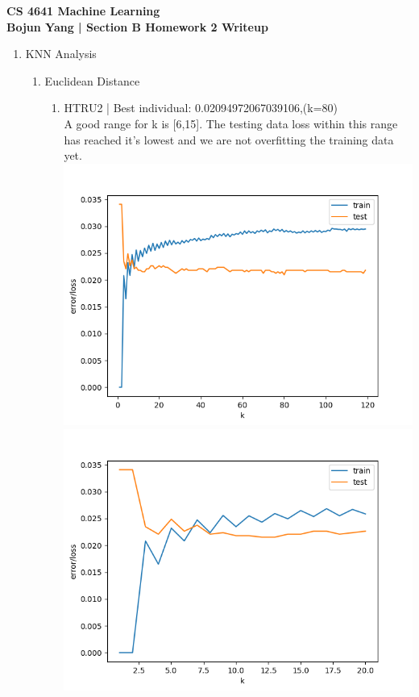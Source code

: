 \documentclass[12pt]{article}
\begin{document}
\begin{center}
    \textbf{CS 4641 Machine Learning \\ Bojun Yang | Section B Homework 2 Writeup}
\end{center}

\begin{enumerate}[noitemsep,topsep=1pt]
\item KNN Analysis
\begin{enumerate}[noitemsep,topsep=1pt]
    \item Euclidean Distance
    \begin{enumerate}[noitemsep,topsep=1pt]
        \item HTRU2 | Best individual: 0.02094972067039106,(k=80)
        \\ A good range for k is [6,15]. The testing data loss within this range has reached it's lowest
        and we are not overfitting the training data yet. 
        \\ \includegraphics[height=0.4\textheight]{HTRU2_euc}
        \\ \includegraphics[height=0.4\textheight]{HTRU2_euc20}

\end{enumerate}
\end{enumerate}
\end{enumerate}
\end{document}
